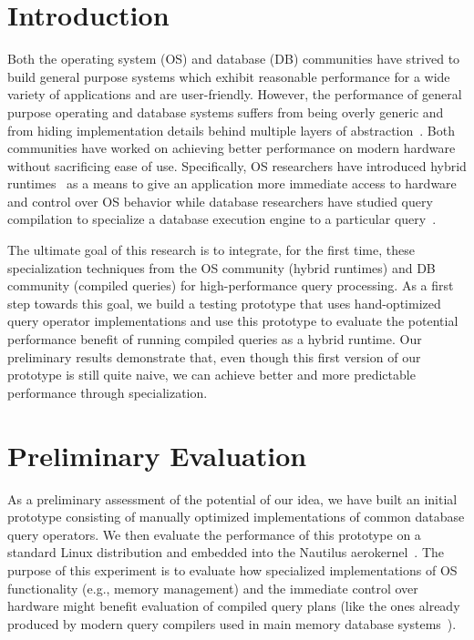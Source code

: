 \documentclass[conference]{IEEEtran}
\begin{document}
\section{Introduction}

  Both the operating system (OS) and database (DB) communities have strived to build general purpose systems which exhibit reasonable performance for a wide variety of applications and are user-friendly.
  However, the performance of general purpose operating and database systems suffers from being overly generic and from hiding implementation details behind multiple layers of abstraction~\cite{GICEVA:2016:OS_SUPPORT}.
Both communities have worked on achieving better performance on modern hardware without sacrificing ease of use. Specifically, OS researchers have introduced hybrid runtimes~\cite{HALE:2017:MULTIVERSE,HALE:2016:MULTIVERSE,HALE:2015:NAUTILUS,HALE:2016:HRTHVM} as a means to give an application more immediate access to hardware and control over OS behavior while database researchers have studied query compilation to specialize a database execution engine to a particular query~\cite{SK16,N11}.

The ultimate goal of this research is to integrate, for the first time, these specialization techniques from the OS community (hybrid runtimes) and DB community (compiled queries) for high-performance query processing.
As a first step towards this goal, we build a testing prototype that uses hand-optimized query operator implementations and use this prototype to evaluate the potential performance benefit of running compiled queries as a hybrid runtime.
%
Our preliminary results demonstrate that, even though this first version of our prototype is still quite naive, we can achieve better and more predictable performance through specialization.
%





\section{Preliminary Evaluation}

As a preliminary assessment of the potential of our idea, we have built an initial prototype consisting of manually optimized implementations of common database query operators.
We then evaluate the performance of this prototype on a standard Linux distribution and embedded into the Nautilus aerokernel~\cite{HALE:2015:NAUTILUS}.
The purpose of this experiment is to evaluate how specialized implementations of OS functionality (e.g., memory management) and the immediate control over hardware might benefit evaluation of compiled query plans (like the ones already produced by modern query compilers used in main memory database systems~\cite{N11}).
\end{document}
